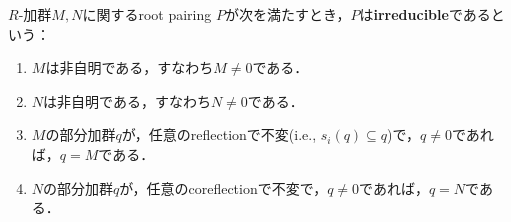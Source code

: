\begin{definition}
  \label{def:RootPairing.IsIrreducible}
  \leanok
  $R$-加群$M, N$に関するroot pairing $P$が次を満たすとき，$P$は\textbf{irreducible}であるという：
  \begin{enumerate}[label=(\roman*)]
    \item $M$は非自明である，すなわち$M \ne 0$である．
    \item $N$は非自明である，すなわち$N \ne 0$である．
    \item $M$の部分加群$q$が，任意のreflectionで不変(i.e., $s_i(q) \subseteq q$)で，$q \ne 0$であれば，$q = M$である．
    \item $N$の部分加群$q$が，任意のcoreflectionで不変で，$q \ne 0$であれば，$q = N$である．
  \end{enumerate}
\end{definition}